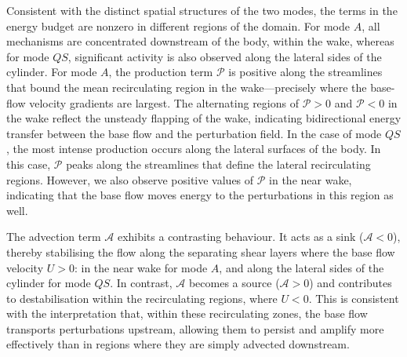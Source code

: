 Consistent with the distinct spatial structures of the two modes, the terms in the energy budget are nonzero in different regions of the domain. For mode $A$, all mechanisms are concentrated downstream of the body, within the wake, whereas for mode $QS$, significant activity is also observed along the lateral sides of the cylinder. For mode $A$, the production term $\mathcal{P}$ is positive along the streamlines that bound the mean recirculating region in the wake—precisely where the base-flow velocity gradients are largest. The alternating regions of $\mathcal{P} > 0$ and $\mathcal{P} < 0$ in the wake reflect the unsteady flapping of the wake, indicating bidirectional energy transfer between the base flow and the perturbation field.
%
In the case of mode $QS$, the most intense production occurs along the lateral surfaces of the body. In this case, $\mathcal{P}$ peaks along the streamlines that define the lateral recirculating regions. However, we also observe positive values of $\mathcal{P}$ in the near wake, indicating that the base flow moves energy to the perturbations in this region as well.

The advection term $\mathcal{A}$ exhibits a contrasting behaviour. It acts as a sink ($\mathcal{A} < 0$), thereby stabilising the flow along the separating shear layers where the base flow velocity $U > 0$: in the near wake for mode $A$, and along the lateral sides of the cylinder for mode $QS$. In contrast, $\mathcal{A}$ becomes a source ($\mathcal{A} > 0$) and contributes to destabilisation within the recirculating regions, where $U < 0$. This is consistent with the interpretation that, within these recirculating zones, the base flow transports perturbations upstream, allowing them to persist and amplify more effectively than in regions where they are simply advected downstream.

